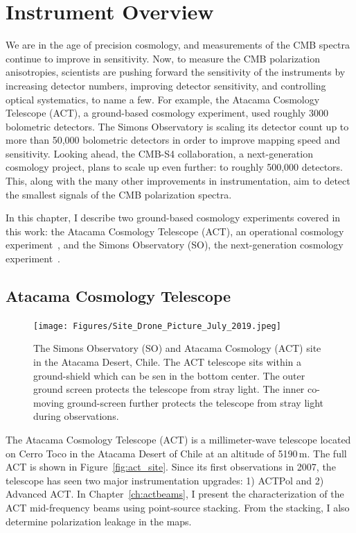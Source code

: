 \chapter{Instrument Overview}
\label{ch:instruments}

We are in the age of precision cosmology, and measurements of the CMB spectra continue to improve in sensitivity.  Now, to measure the CMB polarization anisotropies, scientists are pushing forward the sensitivity of the instruments by increasing detector numbers, improving detector sensitivity, and controlling optical systematics, to name a few.  For example, the Atacama Cosmology Telescope (ACT), a ground-based cosmology experiment, used roughly 3000 bolometric detectors.  The Simons Observatory is scaling its detector count up to more than 50,000 bolometric detectors in order to improve mapping speed and sensitivity.  Looking ahead, the CMB-S4 collaboration, a next-generation cosmology project, plans to scale up even further: to roughly 500,000 detectors.  This, along with the many other improvements in instrumentation, aim to detect the smallest signals of the CMB polarization spectra.

In this chapter, I describe two ground-based cosmology experiments covered in this work: the Atacama Cosmology Telescope (ACT), an operational cosmology experiment~\cite{act_inst}, and the Simons Observatory (SO), the next-generation cosmology experiment~\cite{so19}. 

\section{Atacama Cosmology Telescope}
\begin{figure}[ht]
    \centering
    \texttt{[image: Figures/Site\_Drone\_Picture\_July\_2019.jpeg]}
    \caption{The Simons Observatory (SO) and Atacama Cosmology (ACT) site in the Atacama Desert, Chile. The ACT telescope sits within a ground-shield which can be sen in the bottom center.  The outer ground screen protects the telescope from stray light.  The inner co-moving ground-screen further protects the telescope from stray light during observations.}
    \label{fig:act_so_site}
\end{figure}

The Atacama Cosmology Telescope (ACT) is a millimeter-wave telescope located on Cerro Toco in the Atacama Desert of Chile at an altitude of 5190\,m.  The full ACT is shown in Figure~\ref{fig:act_site}.  Since its first observations in 2007, the telescope has seen two major instrumentation upgrades: 1) ACTPol and 2) Advanced ACT.  In Chapter~\ref{ch:actbeams}, I present the characterization of the ACT mid-frequency beams using point-source stacking.  From the stacking, I also determine polarization leakage in the maps.


